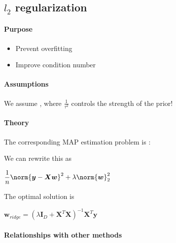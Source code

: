 \subsection{$l_{2}$ regularization}
\paragraph{Purpose}
\begin{itemize}
    \item Prevent overfitting
    \item Improve condition number 

\end{itemize}

\paragraph{Assumptions}
We assume , where
$\frac{1}{\tau^{2}}$ controls the strength of the prior! 

\paragraph{Theory}
The corresponding MAP estimation problem is :

\begin{center}
\end{center}
We can rewrite this as 
\begin{center}
    $\dfrac{1}{n}\norm{\bm{y} - \bm{X}\bm{w}}^{2} + \lambda\norm{\bm{w}}^{2}_{2}$
\end{center}
The optimal solution is 
\begin{center}
    $\bm{w}_{ridge} = \left(\lambda\bm{I}_{D} + \bm{X}^{T}\bm{X}\right)^{-1}\bm{X}^{T}
    \bm{y}$
\end{center}
\paragraph{Relationships with other methods}

